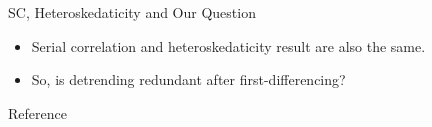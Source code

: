 \documentclass[compress]{beamer}
\begin{document}
\begin{frame}{SC, Heteroskedaticity and Our Question}
  \begin{itemize}
    \item Serial correlation and heteroskedaticity result are also the same.
    \item So, is detrending redundant after first-differencing?
  \end{itemize}

\end{frame}

\begin{frame}[allowframebreaks]{Reference}
  \printbibliography
\end{frame}
\end{document}
